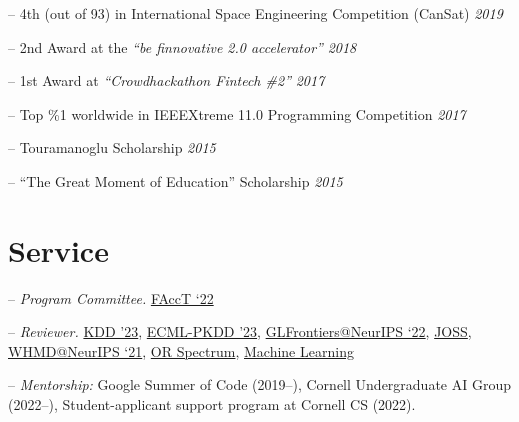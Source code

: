 \documentclass[margin]{res}
\begin{document}
\begin{resume}
\begin{compactitem}
	\item[--] 4th (out of 93) in International Space Engineering  Competition (CanSat) \hfill \emph{2019}
    \item[--] 2nd Award at the \emph{``be finnovative 2.0 accelerator''} \hfill \emph{2018}
   	\item[--] 1st Award at \emph{``Crowdhackathon Fintech \#2''} \hfill \emph{2017}
   	\item[--] Top \%1 worldwide in IEEEXtreme 11.0 Programming Competition \hfill \emph{2017}
    \item [--] Touramanoglu Scholarship \hfill \emph{2015}
    \item [--] ``The Great Moment of Education'' Scholarship \hfill \emph{2015}

\end{compactitem}

\section{Service} 
\begin{compactitem}

\item [--] \emph{Program Committee.} \href{https://facctconference.org/2022}{FAccT `22}
\item [--] \emph{Reviewer.} \href{https://kdd.org/kdd2023/}{KDD '23}, \href{https://2023.ecmlpkdd.org/}{ECML-PKDD '23}, \href{https://glfrontiers.github.io/overview/}{GLFrontiers@NeurIPS `22}, \href{https://joss.theoj.org/}{JOSS}, \href{https://sites.google.com/view/whmd2021}{WHMD@NeurIPS `21},  \href{https://www.springer.com/journal/291?gclid=Cj0KCQiAr5iQBhCsARIsAPcwROPwkZ2Nw4Ubg7i91Y2hITU4OE4lzk_56F09IS09b5wh-sMhuqgft0YaAgATEALw_wcB}{OR Spectrum}, \href{https://www.springer.com/journal/10994/}{Machine Learning}
\item [--] \emph{Mentorship:} Google Summer of Code (2019--), Cornell Undergraduate AI Group (2022--), Student-applicant support program at Cornell CS (2022). 

\end{compactitem}

\end{resume}
\end{document}
